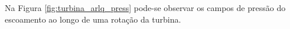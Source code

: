 \begin{figure}[!htbp]
	\label{fig:turbina_arlq_vel}
\end{figure}

Na Figura \ref{fig:turbina_arlq_press} pode-se observar os campos de pressão do escoamento ao longo de uma rotação da turbina.

